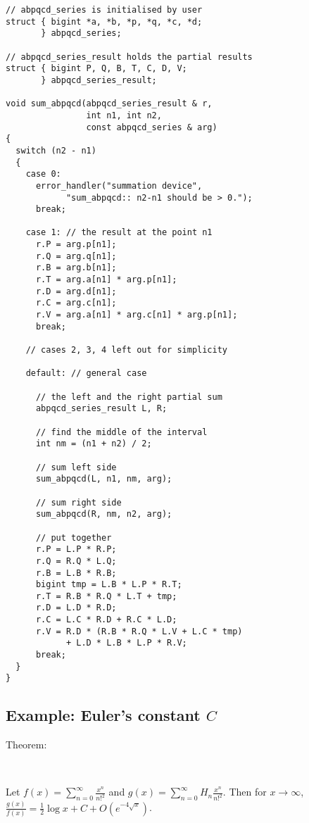 \begin{verbatim}
// abpqcd_series is initialised by user
struct { bigint *a, *b, *p, *q, *c, *d; 
       } abpqcd_series;

// abpqcd_series_result holds the partial results
struct { bigint P, Q, B, T, C, D, V; 
       } abpqcd_series_result;

void sum_abpqcd(abpqcd_series_result & r, 
                int n1, int n2, 
                const abpqcd_series & arg)
{
  switch (n2 - n1)
  {
    case 0:
      error_handler("summation device", 
            "sum_abpqcd:: n2-n1 should be > 0.");
      break;

    case 1: // the result at the point n1
      r.P = arg.p[n1];
      r.Q = arg.q[n1];
      r.B = arg.b[n1];
      r.T = arg.a[n1] * arg.p[n1];
      r.D = arg.d[n1];
      r.C = arg.c[n1];
      r.V = arg.a[n1] * arg.c[n1] * arg.p[n1];
      break;

    // cases 2, 3, 4 left out for simplicity

    default: // general case
     
      // the left and the right partial sum
      abpqcd_series_result L, R;

      // find the middle of the interval
      int nm = (n1 + n2) / 2;
 
      // sum left side
      sum_abpqcd(L, n1, nm, arg);

      // sum right side
      sum_abpqcd(R, nm, n2, arg);

      // put together
      r.P = L.P * R.P;
      r.Q = R.Q * L.Q;
      r.B = L.B * R.B;
      bigint tmp = L.B * L.P * R.T;
      r.T = R.B * R.Q * L.T + tmp;
      r.D = L.D * R.D;
      r.C = L.C * R.D + R.C * L.D;
      r.V = R.D * (R.B * R.Q * L.V + L.C * tmp) 
            + L.D * L.B * L.P * R.V;
      break;
  }
}
\end{verbatim}

\subsection{Example: Euler's constant \( C \) \label{eulergamma}}

\begin{description}
\item [Theorem:]~
\end{description}

Let  \( f(x)=\sum ^{\infty }_{n=0}\frac{x^{n}}{n!^{2}} \) and  
\( g(x)=\sum ^{\infty }_{n=0}H_{n}\frac{x^{n}}{n!^{2}} \). Then for  
\( x\rightarrow \infty  \),  
\( \frac{g(x)}{f(x)}=\frac{1}{2}\log x+C+O\left( e^{-4\sqrt{x}}\right)  \).

